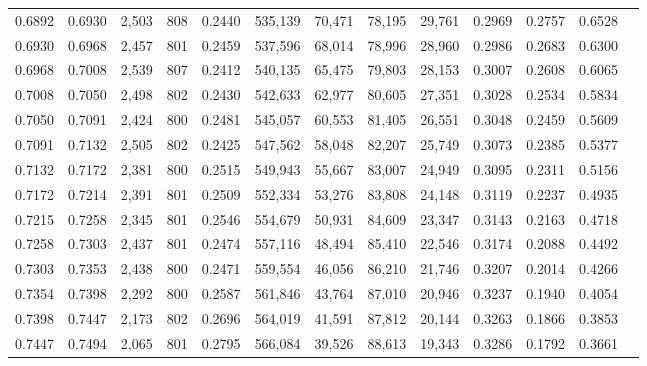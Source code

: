 \begin{tabular}{rrrrrrrrrrrrr}
0.6892 & 0.6930 &  2,503 & 808 &                                     0.2440 & 535,139 &  70,471 &  78,195 &  29,761 & 0.2969 & 0.2757 & 0.6528 \\
0.6930 & 0.6968 &  2,457 & 801 &                                     0.2459 & 537,596 &  68,014 &  78,996 &  28,960 & 0.2986 & 0.2683 & 0.6300 \\
0.6968 & 0.7008 &  2,539 & 807 &                                     0.2412 & 540,135 &  65,475 &  79,803 &  28,153 & 0.3007 & 0.2608 & 0.6065 \\
0.7008 & 0.7050 &  2,498 & 802 &                                     0.2430 & 542,633 &  62,977 &  80,605 &  27,351 & 0.3028 & 0.2534 & 0.5834 \\
0.7050 & 0.7091 &  2,424 & 800 &                                     0.2481 & 545,057 &  60,553 &  81,405 &  26,551 & 0.3048 & 0.2459 & 0.5609 \\
0.7091 & 0.7132 &  2,505 & 802 &                                     0.2425 & 547,562 &  58,048 &  82,207 &  25,749 & 0.3073 & 0.2385 & 0.5377 \\
0.7132 & 0.7172 &  2,381 & 800 &                                     0.2515 & 549,943 &  55,667 &  83,007 &  24,949 & 0.3095 & 0.2311 & 0.5156 \\
0.7172 & 0.7214 &  2,391 & 801 &                                     0.2509 & 552,334 &  53,276 &  83,808 &  24,148 & 0.3119 & 0.2237 & 0.4935 \\
0.7215 & 0.7258 &  2,345 & 801 &                                     0.2546 & 554,679 &  50,931 &  84,609 &  23,347 & 0.3143 & 0.2163 & 0.4718 \\
0.7258 & 0.7303 &  2,437 & 801 &                                     0.2474 & 557,116 &  48,494 &  85,410 &  22,546 & 0.3174 & 0.2088 & 0.4492 \\
0.7303 & 0.7353 &  2,438 & 800 &                                     0.2471 & 559,554 &  46,056 &  86,210 &  21,746 & 0.3207 & 0.2014 & 0.4266 \\
0.7354 & 0.7398 &  2,292 & 800 &                                     0.2587 & 561,846 &  43,764 &  87,010 &  20,946 & 0.3237 & 0.1940 & 0.4054 \\
0.7398 & 0.7447 &  2,173 & 802 &                                     0.2696 & 564,019 &  41,591 &  87,812 &  20,144 & 0.3263 & 0.1866 & 0.3853 \\
0.7447 & 0.7494 &  2,065 & 801 &                                     0.2795 & 566,084 &  39,526 &  88,613 &  19,343 & 0.3286 & 0.1792 & 0.3661 \\

\end{tabular}
